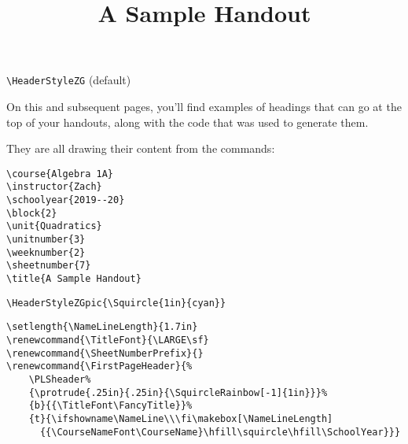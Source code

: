 \documentclass[12pt,twoside,parskip,notitle]{handout}
\title{A Sample Handout}
\begin{document}
\begingroup
\HeaderStyleZG
\maketitle
\verb|\HeaderStyleZG| (default)
\endgroup

\vfill
On this and subsequent pages, you'll find examples of headings that can go at the top of your handouts, along with the code that was used to generate them.

They are all drawing their content from the commands:
\begingroup
\singlespacing
\begin{verbatim}
\course{Algebra 1A}
\instructor{Zach}
\schoolyear{2019--20}
\block{2}
\unit{Quadratics}
\unitnumber{3}
\weeknumber{2}
\sheetnumber{7}
\title{A Sample Handout}
\end{verbatim}
\endgroup

\newpage

\begingroup
{}
\maketitle
\verb|\HeaderStyleZGpic{\Squircle{1in}{cyan}}|
\endgroup

\newpage

\begingroup
\setlength{\NameLineLength}{1.7in}
\renewcommand{\TitleFont}{\LARGE\sf}
\renewcommand{\SheetNumberPrefix}{}
\renewcommand{\FirstPageHeader}{%
	\PLSheader%
	{\protrude{.25in}{.25in}{\SquircleRainbow[-1]{1in}}}%
	{b}{{\TitleFont\FancyTitle}}%
	{t}{\ifshowname\NameLine\\\fi\makebox[\NameLineLength]{{\CourseNameFont\CourseName}\hfill\squircle\hfill\SchoolYear}}}%
\maketitle
\singlespacing
\begin{verbatim}
\setlength{\NameLineLength}{1.7in}
\renewcommand{\TitleFont}{\LARGE\sf}
\renewcommand{\SheetNumberPrefix}{}
\renewcommand{\FirstPageHeader}{%
    \PLSheader%
    {\protrude{.25in}{.25in}{\SquircleRainbow[-1]{1in}}}%
    {b}{{\TitleFont\FancyTitle}}%
    {t}{\ifshowname\NameLine\\\fi\makebox[\NameLineLength]
      {{\CourseNameFont\CourseName}\hfill\squircle\hfill\SchoolYear}}}
\end{verbatim}
\endgroup

\newpage
\end{document}
